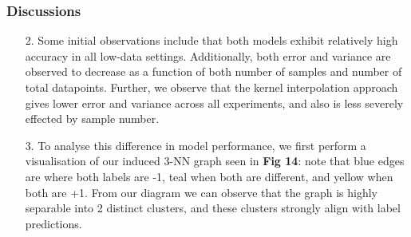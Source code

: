 \documentclass[12pt]{article}
\begin{document}
\subsubsection{Discussions}
\begin{itemize}
    \item[2.]
        Some initial observations include that both models exhibit relatively high accuracy in all low-data settings. Additionally, both error and variance are observed to decrease as a function of both number of samples and number of total datapoints.
        Further, we observe that the kernel interpolation approach gives lower error and variance across all experiments, and also is less severely effected by sample number.
    \item[3.]
        To analyse this difference in model performance, we first perform a visualisation of our induced 3-NN graph seen in \textbf{Fig 14}: note that blue edges are where both labels are -1, teal when both are different, and yellow when both are +1.
        From our diagram we can observe that the graph is highly separable into 2 distinct clusters, and these clusters strongly align with label predictions. 


\end{itemize}
\end{document}
